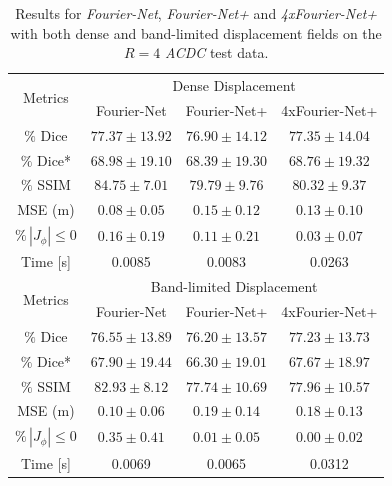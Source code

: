 \begin{table}[h] %
	\centering
	\caption{Results for \emph{Fourier-Net}, \emph{Fourier-Net+} and \emph{4xFourier-Net+} with both dense and band-limited displacement fields on the $R=4$ \emph{ACDC} test data.}
	\label{tab:DenseDisplacementAcc4}
	\begin{tabular}{c c c c} %
		\toprule
		\multirow{2}{*}{Metrics} & \multicolumn{3}{c}{Dense Displacement} \\
		\cmidrule(lr){2-4} 
		 & Fourier-Net & Fourier-Net+ & 4xFourier-Net+\\	
		\midrule
		$\%$ Dice & $77.37 \pm 13.92$ & $76.90 \pm 14.12$ & $77.35 \pm 14.04$\\
		$\%$ Dice* & $68.98 \pm 19.10$ & $68.39 \pm 19.30$ & $68.76 \pm 19.32$ \\
		$\%$ SSIM & $84.75 \pm 7.01$ & $79.79 \pm 9.76$ & $80.32 \pm 9.37$\\
		MSE (m) & $0.08 \pm 0.05$ & $0.15 \pm 0.12$ & $0.13 \pm 0.10$ \\
		$\% \, |J_{\phi}|\leq0$ & $0.16 \pm 0.19$ & $0.11 \pm 0.21$ & $0.03 \pm 0.07$ \\
		Time [s] 	  & 0.0085 & 0.0083 & 0.0263  \\
		\midrule
		\multirow{2}{*}{Metrics} & \multicolumn{3}{c}{Band-limited Displacement} \\
		\cmidrule(lr){2-4} 
		 & Fourier-Net & Fourier-Net+ & 4xFourier-Net+\\		
		\midrule
		$\%$ Dice & $76.55 \pm 13.89$ & $76.20 \pm 13.57$ & $77.23 \pm 13.73$\\
		$\%$ Dice* & $67.90 \pm 19.44$ & $66.30 \pm 19.01$ & $67.67 \pm 18.97$ \\
		$\%$ SSIM & $82.93 \pm 8.12$ & $77.74 \pm 10.69$ & $77.96 \pm 10.57$\\
		MSE (m) & $0.10 \pm 0.06$ & $0.19 \pm 0.14$ & $0.18 \pm 0.13$ \\
		$\% \, |J_{\phi}|\leq0$ & $0.35 \pm 0.41$ & $0.01 \pm 0.05$ & $0.00 \pm 0.02$ \\
		Time [s] 	  & 0.0069  	& 0.0065 	& 0.0312  \\
		\bottomrule
	\end{tabular}	
\end{table}


